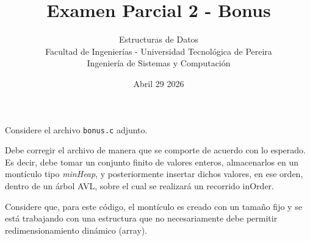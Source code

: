 \documentclass{article}
\title{Examen Parcial 2 - Bonus}
\author{Estructuras de Datos \\ Facultad de Ingenierías - Universidad Tecnológica de Pereira \\ Ingeniería de Sistemas y Computación}
\date{Abril 29 2026}
\begin{document}
\maketitle
\thispagestyle{empty}

Considere el archivo \texttt{bonus.c} adjunto.

\vspace{0.3cm}

Debe corregir el archivo de manera que se comporte de acuerdo con lo esperado. Es decir, debe tomar un conjunto finito de valores enteros, almacenarlos en un montículo tipo \textit{minHeap}, y posteriormente insertar dichos valores, en ese orden, dentro de un árbol AVL, sobre el cual se realizará un recorrido inOrder.

\vspace{0.3cm}

Considere que, para este código, el montículo es creado con un tamaño fijo y se está trabajando con una estructura que no necesariamente debe permitir redimensionamiento dinámico (array).
\end{document}
